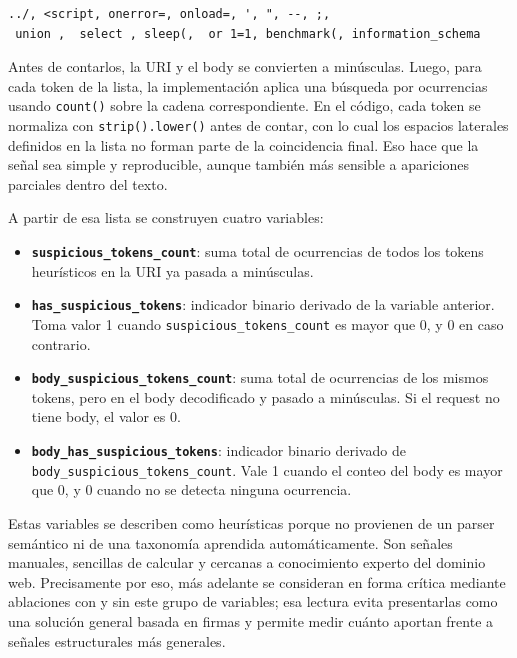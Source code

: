 \documentclass[12pt,oneside]{report}
\begin{document}
\begin{verbatim}
../, <script, onerror=, onload=, ', ", --, ;,
 union ,  select , sleep(,  or 1=1, benchmark(, information_schema
\end{verbatim}

Antes de contarlos, la URI y el body se convierten a minúsculas. Luego, para cada token de la lista, la implementación aplica una búsqueda por ocurrencias usando \texttt{count()} sobre la cadena correspondiente. En el código, cada token se normaliza con \texttt{strip().lower()} antes de contar, con lo cual los espacios laterales definidos en la lista no forman parte de la coincidencia final. Eso hace que la señal sea simple y reproducible, aunque también más sensible a apariciones parciales dentro del texto.

A partir de esa lista se construyen cuatro variables:

\begin{itemize}[leftmargin=*]
  \item \textbf{\texttt{suspicious\_tokens\_count}}: suma total de ocurrencias de todos los tokens heurísticos en la URI ya pasada a minúsculas.

  \item \textbf{\texttt{has\_suspicious\_tokens}}: indicador binario derivado de la variable anterior. Toma valor 1 cuando \texttt{suspicious\_tokens\_count} es mayor que 0, y 0 en caso contrario.

  \item \textbf{\texttt{body\_suspicious\_tokens\_count}}: suma total de ocurrencias de los mismos tokens, pero en el body decodificado y pasado a minúsculas. Si el request no tiene body, el valor es 0.

  \item \textbf{\texttt{body\_has\_suspicious\_tokens}}: indicador binario derivado de \texttt{body\_suspicious\_tokens\_count}. Vale 1 cuando el conteo del body es mayor que 0, y 0 cuando no se detecta ninguna ocurrencia.
\end{itemize}

Estas variables se describen como heurísticas porque no provienen de un parser semántico ni de una taxonomía aprendida automáticamente. Son señales manuales, sencillas de calcular y cercanas a conocimiento experto del dominio web. Precisamente por eso, más adelante se consideran en forma crítica mediante ablaciones con y sin este grupo de variables; esa lectura evita presentarlas como una solución general basada en firmas y permite medir cuánto aportan frente a señales estructurales más generales.
\end{document}
